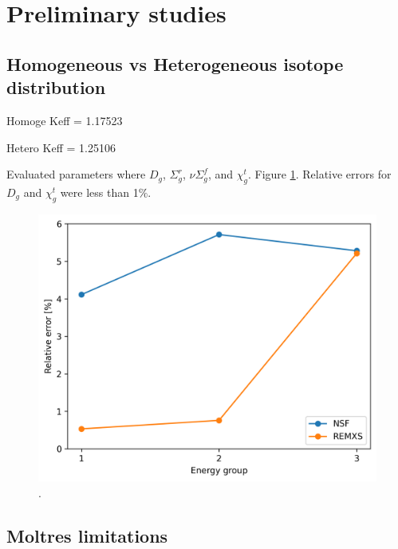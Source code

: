 \documentclass[11pt,letterpaper]{article}
\begin{document}
\section{Preliminary studies}

\subsection{Homogeneous vs Heterogeneous isotope distribution}

Homoge
Keff = 1.17523

Hetero
Keff = 1.25106

Evaluated parameters where $D_g$, $\Sigma^r_g$, $\nu\Sigma^f_g$, and $\chi^t_g$.
Figure \ref{fig:param-comparison}.
Relative errors for $D_g$ and $\chi^t_g$ were less than 1$\%$.

\begin{figure}[htbp!]
	\centering
	\includegraphics[width=0.5\linewidth]{figures/param-comparison}
	\hfill
	\caption{.}
	\label{fig:param-comparison}
\end{figure}

\subsection{Moltres limitations}






\end{document}
